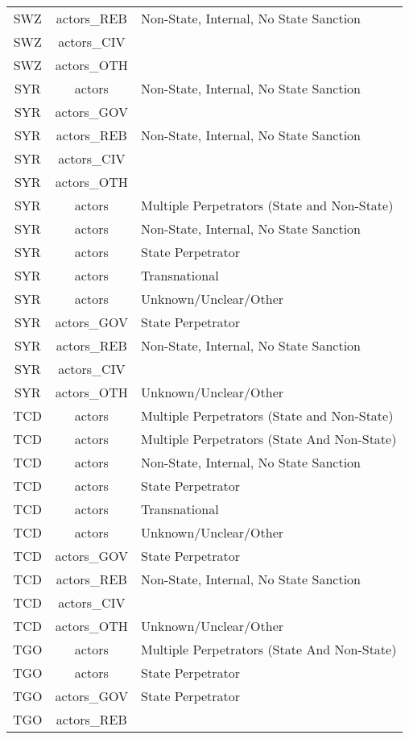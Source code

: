 \documentclass[12pt]{article}
\begin{document}
\begin{center}
\begin{longtable}{|c|c|p{10cm}|}
  SWZ & actors\_REB & Non-State, Internal, No State Sanction \\ 
  SWZ & actors\_CIV &  \\ 
  SWZ & actors\_OTH &  \\ 
  SYR  & actors & Non-State, Internal, No State Sanction \\ 
  SYR  & actors\_GOV &  \\ 
  SYR  & actors\_REB & Non-State, Internal, No State Sanction \\ 
  SYR  & actors\_CIV &  \\ 
  SYR  & actors\_OTH &  \\ 
  SYR & actors & Multiple Perpetrators (State and Non-State) \\ 
  SYR & actors & Non-State, Internal, No State Sanction \\ 
  SYR & actors & State Perpetrator \\ 
  SYR & actors & Transnational \\ 
  SYR & actors & Unknown/Unclear/Other \\ 
  SYR & actors\_GOV & State Perpetrator \\ 
  SYR & actors\_REB & Non-State, Internal, No State Sanction \\ 
  SYR & actors\_CIV &  \\ 
  SYR & actors\_OTH & Unknown/Unclear/Other \\ 
  TCD & actors & Multiple Perpetrators (State and Non-State) \\ 
  TCD & actors & Multiple Perpetrators (State And Non-State) \\ 
  TCD & actors & Non-State, Internal, No State Sanction \\ 
  TCD & actors & State Perpetrator \\ 
  TCD & actors & Transnational \\ 
  TCD & actors & Unknown/Unclear/Other \\ 
  TCD & actors\_GOV & State Perpetrator \\ 
  TCD & actors\_REB & Non-State, Internal, No State Sanction \\ 
  TCD & actors\_CIV &  \\ 
  TCD & actors\_OTH & Unknown/Unclear/Other \\ 
  TGO & actors & Multiple Perpetrators (State And Non-State) \\ 
  TGO & actors & State Perpetrator \\ 
  TGO & actors\_GOV & State Perpetrator \\ 
  TGO & actors\_REB &  \\ 

\end{longtable}
\end{center}
\end{document}

